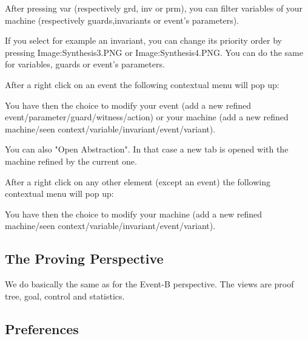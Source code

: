 After pressing var (respectively grd, inv or prm), you can filter variables of your machine (respectively guards,invariants or event's parameters).

If you select for example an invariant, you can change its priority order by pressing Image:Synthesis3.PNG‎ or Image:Synthesis4.PNG‎. You can do the same for variables, guards or event's parameters.

After a right click on an event the following contextual menu will pop up:


You have then the choice to modify your event (add a new refined event/parameter/guard/witness/action) or your machine (add a new refined machine/seen context/variable/invariant/event/variant).

You can also "Open Abstraction". In that case a new tab is opened with the machine refined by the current one.

After a right click on any other element (except an event) the following contextual menu will pop up:


You have then the choice to modify your machine (add a new refined machine/seen context/variable/invariant/event/variant). 

\subsection{The Proving Perspective}

We do basically the same as for the Event-B perspective. The views are proof tree, goal, control and statistics.
 
\subsection{Preferences}

